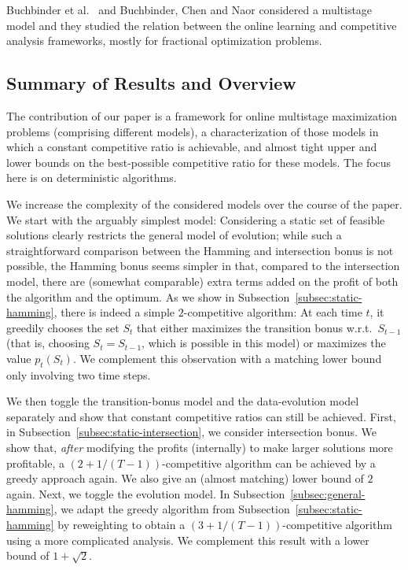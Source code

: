 \documentclass[a4paper]{book}
\newcommand{\finalversion}[1]{#1}
\begin{document}
Buchbinder et
al.~\cite{Buchbinder} and Buchbinder, Chen and Naor \cite{Buchbinder+} considered a multistage model and they studied the relation between the online learning and competitive analysis frameworks, mostly for fractional optimization problems. 

\subsection{Summary of Results and Overview}\label{subsec:results}

The contribution of our paper is a framework for online multistage maximization problems (comprising different models), a characterization of those models in which a constant competitive ratio is achievable, and almost tight upper and lower bounds on the best-possible competitive ratio for these models. \finalversion{The focus here is on deterministic algorithms.}

We increase the complexity of the considered models over the course of the paper. We start with the arguably simplest model: Considering a static set of feasible solutions clearly restricts the general model of evolution; while such a straightforward comparison between the Hamming and intersection bonus is not possible, the Hamming bonus seems simpler in that, compared to the intersection model, there are (somewhat comparable) extra terms added on the profit of both the algorithm and the optimum. As we show in Subsection~\ref{subsec:static-hamming}, there is indeed a simple $2$-competitive algorithm: At each time $t$, it greedily chooses the set $S_t$ that either maximizes the transition bonus w.r.t.\ $S_{t-1}$ (that is, choosing $S_t=S_{t-1}$, which is possible in this model) or maximizes the value $p_t(S_t)$. We complement this observation with a matching lower bound only involving two time steps.

We then toggle the transition-bonus model and the data-evolution model separately and show that constant competitive ratios can still be achieved. First, in Subsection~\ref{subsec:static-intersection}, we consider intersection bonus. We show that, \emph{after} modifying the profits \finalversion{(internally)} to make larger solutions more profitable, a $(2+1/(T-1))$-competitive algorithm can be achieved by a greedy approach again. We also give an (almost matching) lower bound of $2$ again. Next, we toggle the evolution model. In Subsection~\ref{subsec:general-hamming}, we adapt the greedy algorithm from Subsection~\ref{subsec:static-hamming} by reweighting to obtain a $(3+1/(T-1))$-competitive algorithm using a more complicated analysis. We complement this result with a lower bound of $1+\sqrt{2}$.
\end{document}
